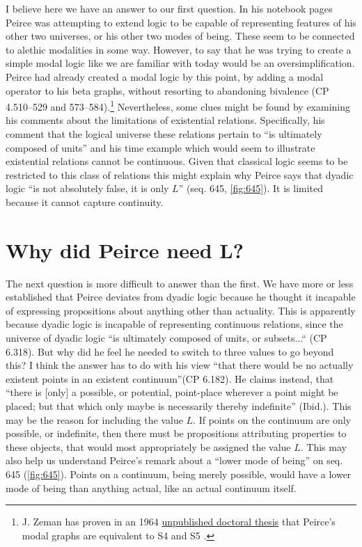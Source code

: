 I believe here we have an answer to our first question. In his notebook pages Peirce was attempting to extend logic to be capable of representing features of his other two universes, or his other two modes of being. These seem to be connected to alethic modalities in some way. However, to say that he was trying to create a simple modal logic like we are familiar with today would be an oversimplification. Peirce had already created a modal logic by this point, by adding a modal operator to his beta graphs, without resorting to abandoning bivalence (CP 4.510--529 and 573--584).\footnote{J. Zeman has proven in an 1964 \href{http://users.clas.ufl.edu/jzeman/graphicallogic/gamma.htm}{unpublished doctoral thesis} that Peirce's modal graphs are equivalent to S4 and S5 \cite{zeman1964graphical}.} Nevertheless, some clues might be found by examining his comments about the limitations of existential relations. Specifically, his comment that the logical universe these relations pertain to ``is ultimately composed of units'' and his time example which would seem to illustrate existential relations cannot be continuous. Given that classical logic seems to be restricted to this class of relations this might explain why Peirce says that dyadic logic ``is not absolutely false, it is only $L$'' (seq. 645, \ref{fig:645}). It is limited because it cannot capture continuity.

\section{Why did Peirce need L?}

The next question is more difficult to answer than the first. We have more or less established that Peirce deviates from dyadic logic because he thought it incapable of expressing propositions about anything other than actuality. This is apparently because dyadic logic is incapable of representing continuous relations, since the universe of dyadic logic ``is ultimately composed of units, or subsets...“ (CP 6.318). But why did he feel he needed to switch to three values to go beyond this? I think the answer has to do with his view ``that there would be no actually existent points in an existent continuum''(CP 6.182). He claims instead, that ``there is [only] a possible, or potential, point-place wherever a point might be placed; but that which only maybe is necessarily thereby indefinite'' (Ibid.). This may be the reason for including the value $L$. If points on the continuum are only possible, or indefinite, then there must be propositions attributing properties to these objects, that would most appropriately be assigned the value $L$. This may also help us understand Peirce's remark about a ``lower mode of being'' on seq. 645 (\ref{fig:645}). Points on a continuum, being merely possible, would have a lower mode of being than anything actual, like an actual continuum itself.

